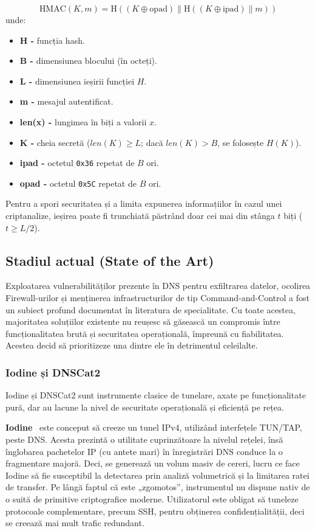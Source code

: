 $$ \text{HMAC}( K, m ) = \text{H}( (K \oplus \text{opad}) \parallel \text{H}( (K \oplus \text{ipad}) \parallel m) ) $$
unde:
\begin{itemize}
    \setlength{\itemsep}{0pt}
    \setlength{\parskip}{0pt}
    \item \textbf{H -} funcția hash.
    \item \textbf{B -} dimensiunea blocului (în octeți).
    \item \textbf{L -} dimensiunea ieșirii funcției $H$.
    \item \textbf{m -} mesajul autentificat.
    \item \textbf{len(x) -} lungimea în biți a valorii $x$.
    \item \textbf{K -} cheia secretă ($len(K) \geq L$; dacă $len(K) > B$, se folosește $H(K)$).
    \item \textbf{ipad -} octetul \texttt{0x36} repetat de $B$ ori.
    \item \textbf{opad -} octetul \texttt{0x5C} repetat de $B$ ori.
\end{itemize}

Pentru a spori securitatea și a limita expunerea informațiilor în cazul unei criptanalize, ieșirea poate fi trunchiată păstrând doar cei mai din stânga $t$ biți ($t \geq L/2$).

\subsection{Stadiul actual (State of the Art)}
Exploatarea vulnerabilităților prezente în DNS pentru exfiltrarea datelor, ocolirea Firewall-urilor și menținerea infrastructurilor de tip Command-and-Control a fost un subiect profund documentat în literatura de specialitate. Cu toate acestea, majoritatea soluțiilor existente nu reușesc să găsească un compromis între funcționalitatea brută și securitatea operațională, împreună cu fiabilitatea. Acestea decid să prioritizeze una dintre ele în detrimentul celeilalte.

\subsubsection{Iodine și DNSCat2}
Iodine și DNSCat2 sunt instrumente clasice de tunelare, axate pe funcționalitate pură, dar au lacune la nivel de securitate operațională și eficiență pe rețea.

\textbf{Iodine}~\cite{iodine_dns} este conceput să creeze un tunel IPv4, utilizând interfețele TUN/TAP, peste DNS. Acesta prezintă o utilitate cuprinzătoare la nivelul rețelei, însă înglobarea pachetelor IP (cu antete mari) în înregistrări DNS conduce la o fragmentare majoră. Deci, se generează un volum masiv de cereri, lucru ce face Iodine să fie susceptibil la detectarea prin analiză volumetrică și la limitarea ratei de transfer. Pe lângă faptul că este „zgomotos”, instrumentul nu dispune nativ de o suită de primitive criptografice moderne. Utilizatorul este obligat să tuneleze protocoale complementare, precum SSH, pentru obținerea confidențialității, deci se creează mai mult trafic redundant.

